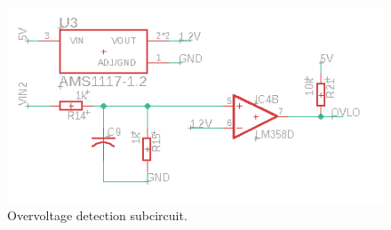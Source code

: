 \documentclass[../main.tex]{subfiles}
\begin{document}
    \begin{figure}[!h]
        \centerline{\includegraphics[width=\linewidth]{media/ovlo_circuit.png}}
        \caption{Overvoltage detection subcircuit.}
        \label{fig:ovlo_circuit}
    \end{figure} 
\end{document}
